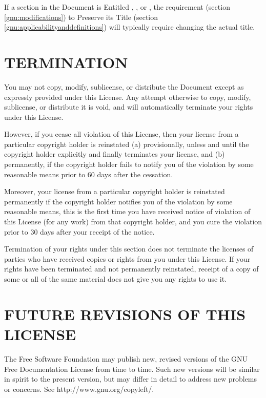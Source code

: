 If a section in the Document is Entitled
, , or ,
the requirement (section \ref{gnu:modifications}) to Preserve 
its Title (section \ref{gnu:applicabilityanddefinitions})
will typically require changing the actual title.

\section{TERMINATION}
\label{gnu:termination}
You may not copy, modify, sublicense, or distribute the
Document except as expressly provided under this License. Any
attempt otherwise to copy, modify, sublicense, or distribute
it is void, and will automatically terminate your rights
under this License.

However, if you cease all violation of this License, then your
license from a particular copyright holder is reinstated (a)
provisionally, unless and until the copyright holder explicitly
and finally terminates your license, and (b) permanently,
if the copyright holder fails to notify you of the violation
by some reasonable means prior to 60 days after the cessation.

Moreover, your license from a particular copyright holder is
reinstated permanently if the copyright holder notifies you
of the violation by some reasonable means, this is the first
time you have received notice of violation of this License
(for any work) from that copyright holder, and you cure the
violation prior to 30 days after your receipt of the notice.

Termination of your rights under this section does not
terminate the licenses of parties who have received copies
or rights from you under this License. If your rights have
been terminated and not permanently reinstated, receipt of
a copy of some or all of the same material does not give you
any rights to use it.

\section{FUTURE REVISIONS OF THIS LICENSE}
\label{gnu:futurerevisionsofthislicense}
The Free Software Foundation may publish new, revised
versions of the GNU Free Documentation License from time to
time. Such new versions will be similar in spirit to the
present version, but may differ in detail to address new
problems or concerns. See http://www.gnu.org/copyleft/.

